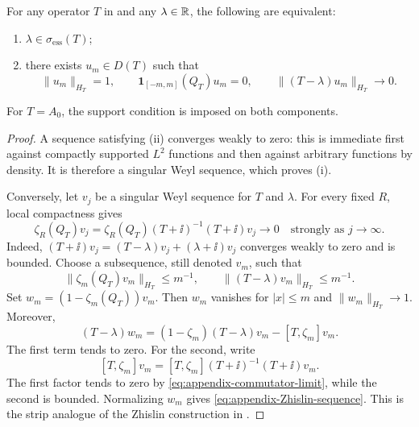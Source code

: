 \begin{lemma}
\label{lem:appendix-Zhislin}
For any operator $T$ in
 and any $\lambda\in\mathbb{R}$, the following
are equivalent:
\begin{enumerate}[label=\textup{(\roman*)},leftmargin=*]
  \item $\lambda\in\sigma_{\mathrm{ess}}(T)$;
  \item there exists $u_m\in D(T)$ such that
  \begin{equation}
    \|u_m\|_{H_T}=1,\qquad
    \mathbf 1_{[-m,m]}(Q_T)u_m=0,\qquad
    \|(T-\lambda)u_m\|_{H_T}\longrightarrow0.
    \label{eq:appendix-Zhislin-sequence}
  \end{equation}
\end{enumerate}
For $T=A_0$, the support condition is imposed on both components.
\end{lemma}
\begin{proof}
A sequence satisfying (ii) converges weakly to zero: this is immediate first
against compactly supported $L^2$ functions and then against arbitrary
functions by density.  It is therefore a singular Weyl sequence, which proves
(i).

Conversely, let $v_j$ be a singular Weyl sequence for $T$ and $\lambda$.
For every fixed $R$, local compactness gives
\[
  \zeta_R(Q_T)v_j
  =\zeta_R(Q_T)(T+\ii)^{-1}(T+\ii)v_j
  \longrightarrow0
  \quad\text{strongly as }j\to\infty.
\]
Indeed,
$(T+\ii)v_j=(T-\lambda)v_j+(\lambda+\ii)v_j$ converges weakly to zero and
is bounded.  Choose a subsequence, still denoted $v_m$, such that
\[
  \|\zeta_m(Q_T)v_m\|_{H_T}\leq m^{-1},\qquad
  \|(T-\lambda)v_m\|_{H_T}\leq m^{-1}.
\]
Set $w_m=(1-\zeta_m(Q_T))v_m$.  Then $w_m$ vanishes for $|x|\leq m$ and
$\|w_m\|_{H_T}\to1$.  Moreover,
\[
  (T-\lambda)w_m
  =(1-\zeta_m)(T-\lambda)v_m-[T,\zeta_m]v_m.
\]
The first term tends to zero.  For the second, write
\[
  [T,\zeta_m]v_m
  =[T,\zeta_m](T+\ii)^{-1}(T+\ii)v_m.
\]
The first factor tends to zero by
\eqref{eq:appendix-commutator-limit}, while the second is bounded.  Normalizing
$w_m$ gives \eqref{eq:appendix-Zhislin-sequence}.  This is the strip analogue
of the Zhislin construction in
\cite[Lemmas~3.11--3.12]{DeNittisEtAl2021}.
\end{proof}

